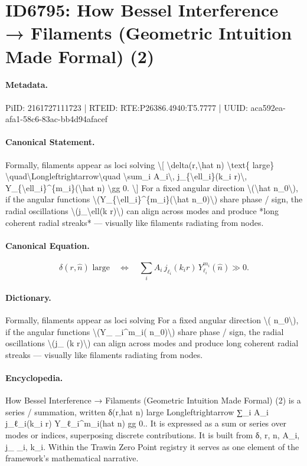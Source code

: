 \section*{ID6795: How Bessel Interference → Filaments (Geometric Intuition Made Formal) (2)}
\paragraph{Metadata.}
PiID: 2161727111723 | RTEID: RTE:P26386.4940:T5.7777 | UUID: aca592ea-afa1-58c6-83ac-bb4d94afacef

\paragraph{Canonical Statement.}
Formally, filaments appear as loci solving \textbackslash{}[ \textbackslash{}delta(r,\textbackslash{}hat n) \textbackslash{}text\{ large\} \textbackslash{}quad\textbackslash{}Longleftrightarrow\textbackslash{}quad \textbackslash{}sum\_i A\_i\textbackslash{}, j\_\{\textbackslash{}ell\_i\}(k\_i r)\textbackslash{}, Y\_\{\textbackslash{}ell\_i\}\textasciicircum{}\{m\_i\}(\textbackslash{}hat n) \textbackslash{}gg 0. \textbackslash{}] For a fixed angular direction \textbackslash{}(\textbackslash{}hat n\_0\textbackslash{}), if the angular functions \textbackslash{}(Y\_\{\textbackslash{}ell\_i\}\textasciicircum{}\{m\_i\}(\textbackslash{}hat n\_0)\textbackslash{}) share phase / sign, the radial oscillations \textbackslash{}(j\_\textbackslash{}ell(k r)\textbackslash{}) can align across modes and produce *long coherent radial streaks* — visually like filaments radiating from nodes.

\paragraph{Canonical Equation.}
\[
\delta(r,\hat n) \text{ large} \quad\Longleftrightarrow\quad \sum_i A_i\, j_{\ell_i}(k_i r)\, Y_{\ell_i}^{m_i}(\hat n) \gg 0.
\]

\paragraph{Dictionary.}
Formally, filaments appear as loci solving For a fixed angular direction \textbackslash{}( n\_0\textbackslash{}), if the angular functions \textbackslash{}(Y\_ \_i\textasciicircum{}m\_i( n\_0)\textbackslash{}) share phase / sign, the radial oscillations \textbackslash{}(j\_ (k r)\textbackslash{}) can align across modes and produce long coherent radial streaks — visually like filaments radiating from nodes.

\paragraph{Encyclopedia.}
How Bessel Interference → Filaments (Geometric Intuition Made Formal) (2) is a series / summation, written δ(r,hat n) large Longleftrightarrow ∑\_i A\_i j\_ℓ\_i(k\_i r) Y\_ℓ\_i\textasciicircum{}m\_i(hat n) gg 0.. It is expressed as a sum or series over modes or indices, superposing discrete contributions. It is built from δ, r, n, A\_i, j\_ \_i, k\_i. Within the Trawin Zero Point registry it serves as one element of the framework's mathematical narrative.
